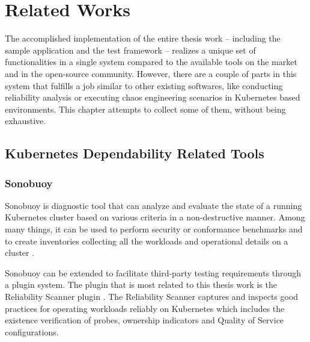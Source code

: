 \chapter{Related Works} \label{related-works}

The accomplished implementation of the entire thesis work -- including the sample application and the test framework -- realizes a unique set of functionalities in a single system compared to the available tools on the market and in the open-source community. However, there are a couple of parts in this system that fulfills a job similar to other existing softwares, like conducting reliability analysis or executing chaos engineering scenarios in Kubernetes based environments. This chapter attempts to collect some of them, without being exhaustive.

\section{Kubernetes Dependability Related Tools}

\subsection{Sonobuoy}

Sonobuoy is diagnostic tool that can analyze and evaluate the state of a running Kubernetes cluster based on various criteria in a non-destructive manner. Among many things, it can be used to perform security or conformance benchmarks and to create inventories collecting all the workloads and operational details on a cluster \cite{Sonobuoy}.

Sonobuoy can be extended to facilitate third-party testing requirements through a plugin system. The plugin that is most related to this thesis work is the Reliability Scanner plugin \cite{SonobuoyReliabilityScanner}. The Reliability Scanner captures and inspects good practices for operating workloads reliably on Kubernetes which includes the existence verification of  probes, ownership indicators and Quality of Service configurations.

